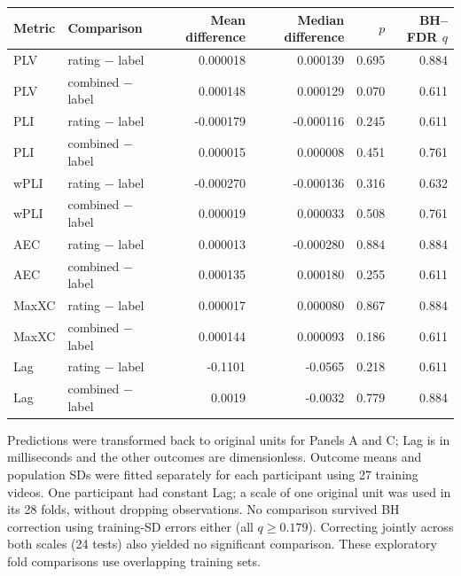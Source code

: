\begin{table}[!htbp]
\begin{tabular}{llrrrr}
\toprule
Metric & Comparison & Mean difference & Median difference & $p$ & BH--FDR $q$ \\
\midrule
PLV & rating $-$ label & 0.000018 & 0.000139 & 0.695 & 0.884 \\
PLV & combined $-$ label & 0.000148 & 0.000129 & 0.070 & 0.611 \\
PLI & rating $-$ label & -0.000179 & -0.000116 & 0.245 & 0.611 \\
PLI & combined $-$ label & 0.000015 & 0.000008 & 0.451 & 0.761 \\
wPLI & rating $-$ label & -0.000270 & -0.000136 & 0.316 & 0.632 \\
wPLI & combined $-$ label & 0.000019 & 0.000033 & 0.508 & 0.761 \\
AEC & rating $-$ label & 0.000013 & -0.000280 & 0.884 & 0.884 \\
AEC & combined $-$ label & 0.000135 & 0.000180 & 0.255 & 0.611 \\
MaxXC & rating $-$ label & 0.000017 & 0.000080 & 0.867 & 0.884 \\
MaxXC & combined $-$ label & 0.000144 & 0.000093 & 0.186 & 0.611 \\
Lag & rating $-$ label & -0.1101 & -0.0565 & 0.218 & 0.611 \\
Lag & combined $-$ label & 0.0019 & -0.0032 & 0.779 & 0.884 \\
\bottomrule
\end{tabular}\par
\vspace{3pt}
\begin{minipage}{0.96\linewidth}
\footnotesize Predictions were transformed back to original units for Panels A and C; Lag is in milliseconds and the other outcomes are dimensionless. Outcome means and population SDs were fitted separately for each participant using 27 training videos. One participant had constant Lag; a scale of one original unit was used in its 28 folds, without dropping observations. No comparison survived BH correction using training-SD errors either (all $q\geq0.179$). Correcting jointly across both scales (24 tests) also yielded no significant comparison. These exploratory fold comparisons use overlapping training sets.
\end{minipage}
\end{table}
